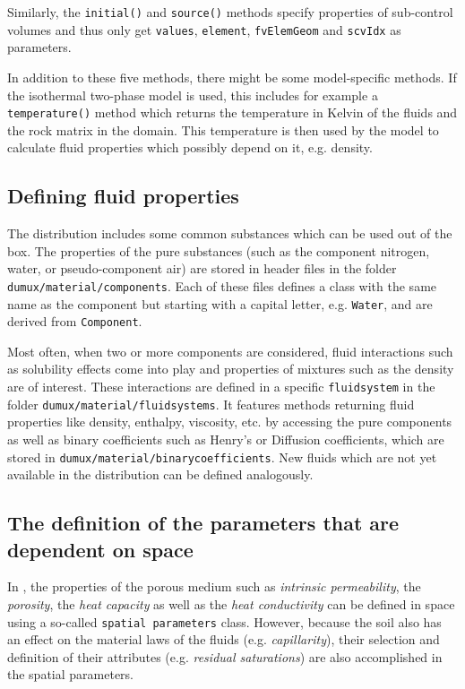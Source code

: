 Similarly, the \texttt{initial()} and \texttt{source()} methods
specify properties of sub-control volumes and thus only get
\texttt{values}, \texttt{element}, \texttt{fvElemGeom} and
\texttt{scvIdx} as parameters.

In addition to these five methods, there might be some model-specific
methods. If the isothermal two-phase model is used, this includes 
for example a \texttt{temperature()} method which returns the temperature in Kelvin
of the fluids and the rock matrix in the domain. This temperature is
then used by the model to calculate fluid properties which possibly
depend on it, e.g. density.


\subsection{Defining fluid properties}\label{tutorial-coupled:description-fluid-class}

The \Dumux distribution includes some common substances which can be used
out of the box. The properties of the pure substances (such as the component 
nitrogen, water, or pseudo-component air) are stored in header files in 
the folder \verb+dumux/material/components+. Each of these files 
defines a class with the same name as the component but starting with a capital
letter, e.g. \texttt{Water}, and are derived from \texttt{Component}.

Most often, when two or more components are considered, fluid interactions 
such as solubility effects come into play and properties of mixtures such as 
the density are of interest. These interactions are defined in
a specific \verb+fluidsystem+ in the folder \verb+dumux/material/fluidsystems+.
It features methods returning fluid properties like density, enthalpy, viscosity,
etc. by accessing the pure components as well as binary coefficients such as
Henry's or Diffusion coefficients, which are stored in 
\verb+dumux/material/binarycoefficients+. New fluids which are not yet
 available in the \Dumux distribution can be defined analogously.

\subsection{The definition of the parameters that are dependent on space}\label{tutorial-coupled:description-spatialParameters}

In \Dumux, the properties of the porous medium such as \textit{intrinsic 
permeability}, the \textit{porosity}, the \textit{heat capacity} as
well as the \textit{heat conductivity} can be defined in space using a
so-called \texttt{spatial parameters} class.  However, because the soil
also has an effect on the material laws of the fluids (e.g. \textit{capillarity}),
their selection and definition of their attributes (e.g. \textit{residual 
saturations}) are also accomplished in the spatial parameters.

